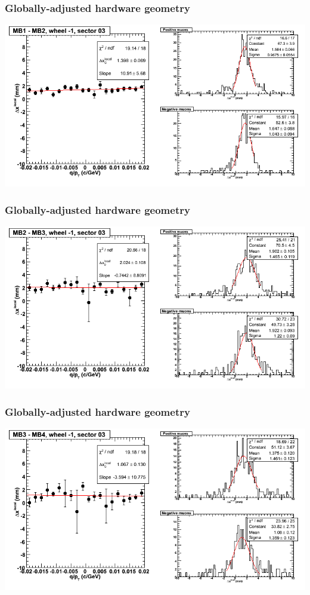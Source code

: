 \documentclass[compress]{beamer}
\begin{document}
\begin{frame}
\frametitle{Globally-adjusted hardware geometry}
\includegraphics[width=\linewidth]{NOV4_segdiffs_HW/dt13_resid_B_03_12.png}
\end{frame}

\begin{frame}
\frametitle{Globally-adjusted hardware geometry}
\includegraphics[width=\linewidth]{NOV4_segdiffs_HW/dt13_resid_B_03_23.png}
\end{frame}

\begin{frame}
\frametitle{Globally-adjusted hardware geometry}
\includegraphics[width=\linewidth]{NOV4_segdiffs_HW/dt13_resid_B_03_34.png}
\end{frame}
\end{document}
